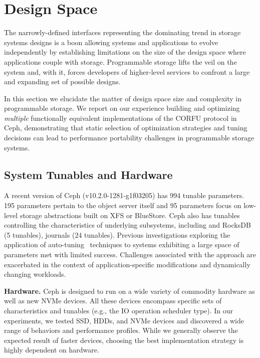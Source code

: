 \section{Design Space}
\label{sec:dspace}

The narrowly-defined interfaces representing the dominating trend in storage systems designs
is a boon allowing systems and applications to evolve independently by establishing limitations on the
size of the design space where applications couple with storage. Programmable
storage lifts the veil on the system and, with it, forces developers of higher-level services
to confront a large and expanding set of possible designs.

In this section we elucidate the matter of design space size and complexity in
programmable storage. We report on our experience building and optimizing
\emph{multiple} functionally equivalent implementations of the CORFU protocol
in Ceph, demonstrating that static selection of optimization strategies and tuning
decisions can lead to performance portability challenges in programmable
storage systems.

\subsection{System Tunables and Hardware}

A recent version of Ceph (v10.2.0-1281-g1f03205) has 994 tunable parameters.
195 parameters pertain to the object server itself and 95 parameters focus on
low-level storage abstractions built on XFS or BlueStore. Ceph also has
tunables controlling the characteristics of underlying subsystems, including and RocksDB (5
tunables), journals (24 tunables).
Previous investigations exploring the application of 
auto-tuning~\cite{behzad:sc2013-autotuning} techniques to systems exhibiting a large space of parameters 
met with limited success. Challenges associated with the approach are exacerbated in the context of
application-specific modifications and dynamically changing workloads.

{\bf Hardware.} Ceph is designed to run on a wide variety of commodity
hardware as well as new NVMe devices. All these devices encompass specific sets of
characteristics and tunables (e.g., the IO operation scheduler type). In our
experiments, we tested SSD, HDDs, and NVMe devices and discovered a wide range of
behaviors and performance profiles. While we generally observe the expected
result of faster devices, choosing the best implementation strategy is highly dependent on hardware.

